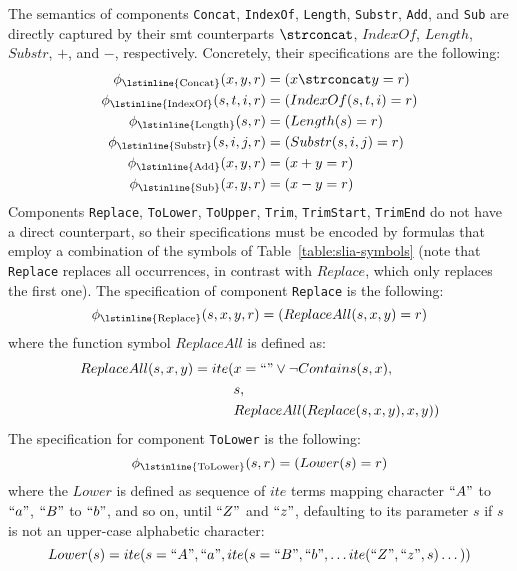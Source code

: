 \raggedbottom
%
The semantics of components \lstinline{Concat}, \lstinline{IndexOf},
\lstinline{Length}, \lstinline{Substr}, \lstinline{Add}, and \lstinline{Sub}
are directly captured by their \gls{smt} counterparts $\strconcat$, $IndexOf$,
$Length$, $Substr$, $+$, and $-$, respectively.
Concretely, their specifications are the following:
%
\begin{align*}
  \phi{}_{\text{\lstinline{Concat}}}(x, y, r)     &= (x \strconcat y   = r) \\
  \phi{}_{\text{\lstinline{IndexOf}}}(s, t, i, r) &= (IndexOf(s, t, i) = r) \\
  \phi{}_{\text{\lstinline{Length}}}(s, r)        &= (Length(s)        = r) \\
  \phi{}_{\text{\lstinline{Substr}}}(s, i, j, r)  &= (Substr(s, i, j)  = r) \\
  \phi{}_{\text{\lstinline{Add}}}(x, y, r)        &= (x + y            = r) \\
  \phi{}_{\text{\lstinline{Sub}}}(x, y, r)        &= (x - y            = r) \\
\end{align*}
%
\noindent
Components \lstinline{Replace}, \lstinline{ToLower}, \lstinline{ToUpper},
\lstinline{Trim}, \lstinline{TrimStart}, \lstinline{TrimEnd} do not have a
direct counterpart, so their specifications must be encoded by formulas that
employ a combination of the symbols of Table~\ref{table:slia-symbols}
(note that \lstinline{Replace} replaces all occurrences, in contrast with
$Replace$, which only replaces the first one).
The specification of component \lstinline{Replace} is the following:
%
\[
  \phi{}_{\text{\lstinline{Replace}}}(s, x, y, r) = (ReplaceAll(s, x, y) = r)
\]
%
where the function symbol $ReplaceAll$ is defined as:
\begin{align*}
  ReplaceAll(s, x, y) = ite(&x = ``" \lor{} \neg{}Contains(s, x), \\
                            &s,                                   \\
                            &ReplaceAll(Replace(s, x, y), x, y))
\end{align*}
%
The specification for component \lstinline{ToLower} is the following:
%
\[
  \phi{}_{\text{\lstinline{ToLower}}}(s, r) = (Lower(s) = r)
\]
%
where the $Lower$ is defined as sequence of $ite$ terms mapping character $``A"$
to $``a"$, $``B"$ to $``b"$, and so on, until $``Z"$ and $``z"$, defaulting to
its parameter $s$ if $s$ is not an upper-case alphabetic character:
%
\[
  Lower(s) = ite(s = ``A", ``a", ite(s = ``B", ``b", \ldots{}
  ite(``Z", ``z", s)\ldots{}))
\]
